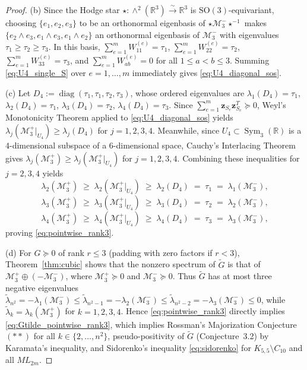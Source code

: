 \documentclass[11pt,a4paper]{article}
\theoremstyle{plain}
\theoremstyle{definition}
\theoremstyle{remark}
\DeclareMathOperator{\Sym}{Sym}
\DeclareMathOperator{\diag}{diag}
\begin{document}
\begin{proof}
(b) Since the Hodge star $\star : \wedge^2(\mathbb{R}^3) \xrightarrow{\sim} \mathbb{R}^3$ is $\mathrm{SO}(3)$-equivariant, choosing $\{e_1, e_2, e_3\}$ to be an orthonormal eigenbasis of $\star \mathcal{M}_3^- \star^{-1}$ makes $\{e_2 \wedge e_3, e_1 \wedge e_3, e_1 \wedge e_2\}$ an orthonormal eigenbasis of $\mathcal{M}_3^-$ with eigenvalues $\tau_1 \ge \tau_2 \ge \tau_3$. In this basis, $\sum_{e=1}^m W_{11}^{(e)} = \tau_1$, $\sum_{e=1}^m W_{22}^{(e)} = \tau_2$, $\sum_{e=1}^m W_{33}^{(e)} = \tau_3$, and $\sum_{e=1}^m W_{ab}^{(e)} = 0$ for all $1 \le a < b \le 3$. Summing \eqref{eq:U4_single_S} over $e = 1,\dots,m$ immediately gives \eqref{eq:U4_diagonal_sos}.

(c) Let $D_4 := \diag(\tau_1, \tau_1, \tau_2, \tau_3)$, whose ordered eigenvalues are $\lambda_1(D_4) = \tau_1$, $\lambda_2(D_4) = \tau_1$, $\lambda_3(D_4) = \tau_2$, $\lambda_4(D_4) = \tau_3$. Since $\sum_{e=1}^m \mathbf{z}_{S_e}\mathbf{z}_{S_e}^T \succeq 0$, Weyl's Monotonicity Theorem applied to \eqref{eq:U4_diagonal_sos} yields $\lambda_j(\mathcal{M}_3^+|_{U_4}) \ge \lambda_j(D_4)$ for $j = 1, 2, 3, 4$. Meanwhile, since $U_4 \subset \Sym_3(\mathbb{R})$ is a $4$-dimensional subspace of a $6$-dimensional space, Cauchy's Interlacing Theorem gives $\lambda_j(\mathcal{M}_3^+) \ge \lambda_j(\mathcal{M}_3^+|_{U_4})$ for $j = 1, 2, 3, 4$. Combining these inequalities for $j = 2, 3, 4$ yields
\[
  \lambda_2(\mathcal{M}_3^+) \;\ge\; \lambda_2(\mathcal{M}_3^+|_{U_4}) \;\ge\; \lambda_2(D_4) \;=\; \tau_1 \;=\; \lambda_1(\mathcal{M}_3^-),
\]
\[
  \lambda_3(\mathcal{M}_3^+) \;\ge\; \lambda_3(\mathcal{M}_3^+|_{U_4}) \;\ge\; \lambda_3(D_4) \;=\; \tau_2 \;=\; \lambda_2(\mathcal{M}_3^-),
\]
\[
  \lambda_4(\mathcal{M}_3^+) \;\ge\; \lambda_4(\mathcal{M}_3^+|_{U_4}) \;\ge\; \lambda_4(D_4) \;=\; \tau_3 \;=\; \lambda_3(\mathcal{M}_3^-),
\]
proving \eqref{eq:pointwise_rank3}.

(d) For $G \succeq 0$ of rank $r \le 3$ (padding with zero factors if $r < 3$), Theorem~\ref{thm:cubic} shows that the nonzero spectrum of $\widetilde{G}$ is that of $\mathcal{M}_3^+ \oplus (-\mathcal{M}_3^-)$, where $\mathcal{M}_3^+ \succeq 0$ and $\mathcal{M}_3^- \succeq 0$. Thus $\widetilde{G}$ has at most three negative eigenvalues $\widetilde{\lambda}_{n^2} = -\lambda_1(\mathcal{M}_3^-) \le \widetilde{\lambda}_{n^2-1} = -\lambda_2(\mathcal{M}_3^-) \le \widetilde{\lambda}_{n^2-2} = -\lambda_3(\mathcal{M}_3^-) \le 0$, while $\widetilde{\lambda}_k = \lambda_k(\mathcal{M}_3^+)$ for $k = 1, 2, 3, 4$. Hence \eqref{eq:pointwise_rank3} directly implies \eqref{eq:Gtilde_pointwise_rank3}, which implies Rossman's Majorization Conjecture~$(**)$ for all $k \in \{2,\dots,n^2\}$, pseudo-positivity of $\widetilde{G}$ (Conjecture~3.2) by Karamata's inequality, and Sidorenko's inequality \eqref{eq:sidorenko} for $K_{5,5} \setminus C_{10}$ and all $ML_{2m}$.
\end{proof}
\end{document}
